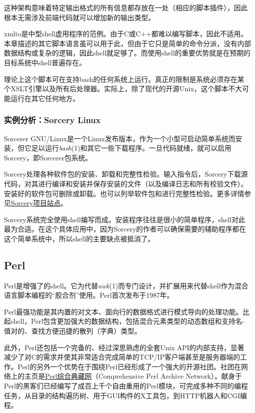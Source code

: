 \documentclass[12pt,oneside]{book}
\begin{document}
这种架构意味着特定输出格式的所有信息都存放在一处（相应的脚本插件），因此根本无需涉及前端代码就可以增加新的输出类型。

xmlto是中型shell虚用程序的范例。由于C或C++都难以编写脚本，因此不适用。本章描述的其它脚本语言虽可以用于此，但由于它只是简单的命令分派，没有内部数据结构或复杂的逻辑，因此shell就足够了。而使用shell的重要优势就是在预期的目标系统中shell普遍存在。

理论上这个脚本可在支持bash的任何系统上运行。真正的限制是系统必须存在某个XSLT引擎以及所有后处理器。实际上，除了现代的开源Unix，这个脚本不大可能运行在其它任何地方。

\subsubsection{实例分析：Sorcery Linux}
Sorcerer GNU/Linux是一个Linux发布版本，作为一个小型可启动简单系统而安装，但它足以运行\textit{bash}(1)和其它一些下载程序。一旦代码就绪，就可以启用Sorcery，即Sorcerer包系统。

Sorcery处理各种软件包的安装、卸载和完整性检验。输入指令后，Sorcery下载源代码，对其进行编译和安装并保存安装的文件（以及编译日志和所有校验文件）。安装好的软件包可删除或卸载。也可以列举软件包和进行完整性检验。更多详情参见\href{http://sorcerer.wox.org/}{Sorcery项目站点}。

Sorcery系统完全使用shell编写而成。安装程序往往是很小的简单程序，shell对此最为合适。在这个具体应用中，因为Sorcery的作者可以确保需要的辅助程序都在这个简单系统中，所以shell的主要缺点被抵消了。


\subsection{Perl}
Perl是增强了的shell。它为代替\textit{awk}(1)而专门设计，并扩展用来代替shell作为混合语言脚本编程的“胶合剂”使用。Perl首次发布于1987年。

Perl最强功能是其内置的对文本、面向行的数据格式进行模式导向的处理功能。比起shell，Perl包含更加强大的数据结构，包括混合元素类型的动态数组和支持名-值对的、查找方便迅捷的散列（字典）类型。

此外，Perl还包括一个完备的、经过深思熟虑的全套Unix API的内部支持，显著减少了对C的需求并使其非常适合完成简单的TCP/IP客户端甚至是服务器端的工作。Perl的另外一个优势在于围绕Perl已经形成了一个强大的开源社团。社团在网络上的主页是\href{http://www.cpan.org/}{Perl综合典藏网}（Comprehensive Perl Archive Network）。献身于Perl的黑客们已经编写了成百上千个自由重用的Perl模块，可完成多种不同的编程任务，从目录的结构遍历树、用于GUI构件的X工具包，到HTTP机器人和CGI编程。
\end{document}
